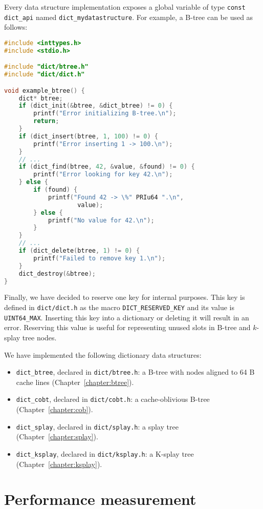 Every data structure implementation exposes a global variable of type
\texttt{const dict\_api} named \texttt{dict\_mydatastructure}. For example,
a B-tree can be used as follows:

\begin{lstlisting}[language=C]
#include <inttypes.h>
#include <stdio.h>

#include "dict/btree.h"
#include "dict/dict.h"

void example_btree() {
	dict* btree;
	if (dict_init(&btree, &dict_btree) != 0) {
		printf("Error initializing B-tree.\n");
		return;
	}
	if (dict_insert(btree, 1, 100) != 0) {
		printf("Error inserting 1 -> 100.\n");
	}
	// ...
	if (dict_find(btree, 42, &value, &found) != 0) {
		printf("Error looking for key 42.\n");
	} else {
		if (found) {
			printf("Found 42 -> \%" PRIu64 ".\n",
					value);
		} else {
			printf("No value for 42.\n");
		}
	}
	// ...
	if (dict_delete(btree, 1) != 0) {
		printf("Failed to remove key 1.\n");
	}
	dict_destroy(&btree);
}
\end{lstlisting}

Finally, we have decided to reserve one key for internal purposes.
This key is defined in \texttt{dict/dict.h} as the macro
\texttt{DICT\_RESERVED\_KEY} and its value is \texttt{UINT64\_MAX}.
Inserting this key into a dictionary or deleting it will result in an error.
Reserving this value is useful for representing unused slots in B-tree
and $k$-splay tree nodes.

We have implemented the following dictionary data structures:
\begin{itemize}
\item \texttt{dict\_btree}, declared in \texttt{dict/btree.h}:
	a B-tree with nodes aligned to 64 B cache lines
	(Chapter~\ref{chapter:btree}).
\item \texttt{dict\_cobt}, declared in \texttt{dict/cobt.h}:
	a cache-oblivious B-tree (Chapter~\ref{chapter:cob}).
\item \texttt{dict\_splay}, declared in \texttt{dict/splay.h}:
	a splay tree (Chapter~\ref{chapter:splay}).
\item \texttt{dict\_ksplay}, declared in \texttt{dict/ksplay.h}:
	a K-splay tree (Chapter~\ref{chapter:ksplay}). %
\end{itemize}

\section{Performance measurement}


